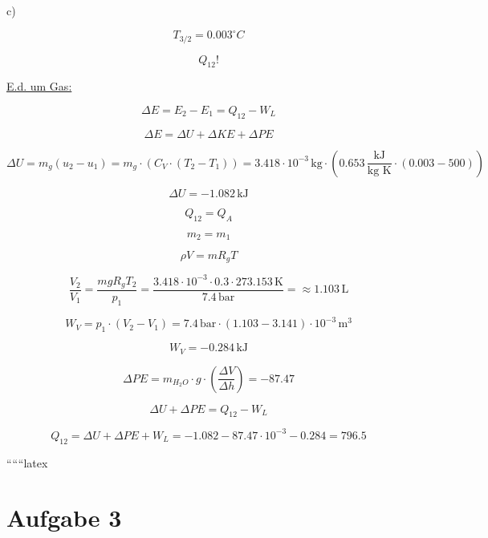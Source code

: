 c)

\[
T_{3/2} = 0.003^\circ C
\]

\[
Q_{12}!
\]

\underline{E.d. um Gas:}

\[
\Delta E = E_2 - E_1 = Q_{12} - W_L
\]

\[
\Delta E = \Delta U + \Delta KE + \Delta PE
\]

\[
\Delta U = m_g (u_2 - u_1) = m_g \cdot (C_V \cdot (T_2 - T_1)) = 3.418 \cdot 10^{-3} \, \text{kg} \cdot \left(0.653 \, \frac{\text{kJ}}{\text{kg K}} \cdot (0.003 - 500)\right)
\]

\[
\Delta U = -1.082 \, \text{kJ}
\]

\[
Q_{12} = Q_{A}
\]

\[
m_2 = m_1
\]

\[
\rho V = m R_g T
\]

\[
\frac{V_2}{V_1} = \frac{m g R_g T_2}{p_1} = \frac{3.418 \cdot 10^{-3} \cdot 0.3 \cdot 273.153 \, \text{K}}{7.4 \, \text{bar}} = \approx 1.103 \, \text{L}
\]

\[
W_V = p_1 \cdot (V_2 - V_1) = 7.4 \, \text{bar} \cdot (1.103 - 3.141) \cdot 10^{-3} \, \text{m}^3
\]

\[
W_V = -0.284 \, \text{kJ}
\]

\[
\Delta PE = m_{H_2O} \cdot g \cdot \left(\frac{\Delta V}{\Delta h}\right) = -87.47
\]

\[
\Delta U + \Delta PE = Q_{12} - W_L
\]

\[
Q_{12} = \Delta U + \Delta PE + W_L = -1.082 - 87.47 \cdot 10^{-3} - 0.284 = 796.5
\]

``````latex


\section*{Aufgabe 3}